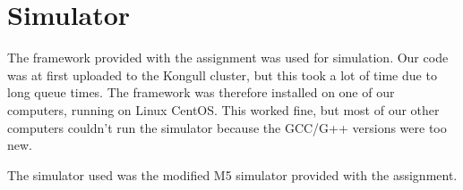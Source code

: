\section*{Simulator}
The framework provided with the assignment was used for simulation. Our code was at first uploaded to the Kongull cluster, but this took a lot of time due to long queue times. The framework was therefore installed on one of our computers, running on Linux CentOS. This worked fine, but most of our other computers couldn't run the simulator because the GCC/G++ versions were too new. 

The simulator used was the modified M5 simulator provided with the assignment. 